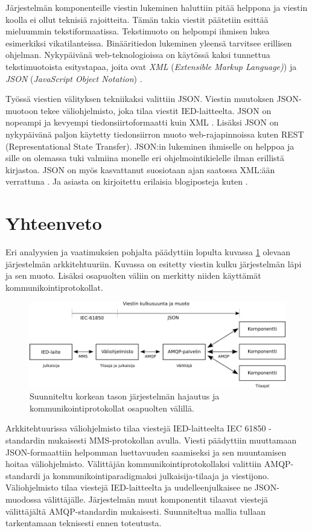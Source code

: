 Järjestelmän komponenteille viestin lukeminen haluttiin pitää helppona ja viestin koolla ei ollut teknisiä rajoitteita. Tämän takia viestit päätetiin esittää mieluummin tekstiformaatissa. Tekstimuoto on helpompi ihmisen lukea esimerkiksi vikatilanteissa. Binääritiedon lukeminen yleensä tarvitsee erillisen ohjelman. Nykypäivänä web-teknologioissa on käytössä kaksi tunnettua tekstimuotoista esitystapaa, joita ovat \emph{XML} (\emph{Extensible Markup Language)}) \cite{xml-specification} ja \emph{JSON} (\emph{JavaScript Object Notation}) \cite{json-standard}.

Työssä viestien välityksen tekniikaksi valittiin JSON. Viestin muutoksen JSON-muotoon tekee väliohjelmisto, joka tilaa viestit IED-laitteelta. JSON on nopeampi ja kevyempi tiedonsiirtoformaatti kuin XML \cite{json-xml-comparison}. Lisäksi JSON on nykypäivänä paljon käytetty tiedonsiirron muoto web-rajapinnoissa kuten REST (Representational State Transfer). JSON:in lukeminen ihmiselle on helppoa ja sille on olemassa tuki valmiina monelle eri ohjelmointikielelle ilman erillistä kirjastoa. JSON on myös kasvattanut suosiotaan ajan saatossa XML:ään verrattuna \cite{google-trends-xml-json}. Ja asiasta on kirjoitettu erilaisia blogiposteja kuten \cite{the-rise-and-rise-of-json, why-json-is-better-than-xml, Patrizio2016}.


\section{Yhteenveto}
Eri analyysien ja vaatimuksien pohjalta päädyttiin lopulta kuvassa \ref{fig:high-level-system-architecture} olevaan järjestelmän arkkitehtuuriin. Kuvassa on esitetty viestin kulku järjestelmän läpi ja sen muoto. Lisäksi osapuolten väliin on merkitty niiden käyttämät kommunikointiprotokollat.

\begin{figure}[ht!]
	\includegraphics[width=1\textwidth]{pictures/high-level-system-architecture.png}
	\caption{Suunniteltu korkean tason järjestelmän hajautus ja kommunikointiprotokollat osapuolten välillä.}
	\label{fig:high-level-system-architecture}
\end{figure}

Arkkitehtuurissa väliohjelmisto tilaa viestejä IED-laitteelta IEC 61850 -standardin mukaisesti MMS-protokollan avulla. Viesti päädyttiin muuttamaan JSON-formaattiin helpomman luettavuuden saamiseksi ja sen muuntamisen hoitaa väliohjelmisto. Välittäjän kommunikointiprotokollaksi valittiin AMQP-standardi ja kommunikointiparadigmaksi jul\-kai\-si\-ja-ti\-laa\-ja ja viestijono. Väliohjelmisto tilaa viestejä IED-laitteelta ja uudelleenjulkaisee ne JSON-muodossa välittäjälle. Järjestelmän muut komponentit tilaavat viestejä välittäjältä AMQP-standardin mukaisesti. Suunniteltua mallia tullaan tarkentamaan teknisesti ennen toteutusta.
